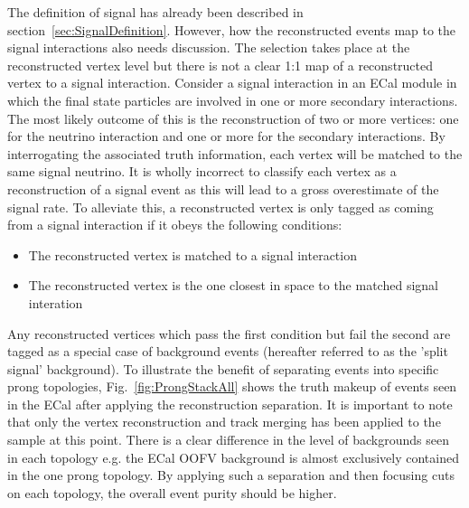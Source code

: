 \newline
The definition of signal has already been described in section~\ref{sec:SignalDefinition}.  However, how the reconstructed events map to the signal interactions also needs discussion.  The selection takes place at the reconstructed vertex level but there is not a clear 1:1 map of a reconstructed vertex to a signal interaction.  Consider a signal interaction in an ECal module in which the final state particles are involved in one or more secondary interactions.  The most likely outcome of this is the reconstruction of two or more vertices: one for the neutrino interaction and one or more for the secondary interactions.  By interrogating the associated truth information, each vertex will be matched to the same signal neutrino.  It is wholly incorrect to classify each vertex as a reconstruction of a signal event as this will lead to a gross overestimate of the signal rate.  To alleviate this,  a reconstructed vertex is only tagged as coming from a signal interaction if it obeys the following conditions:
\begin{itemize}
  \item The reconstructed vertex is matched to a signal interaction
  \item The reconstructed vertex is the one closest in space to the matched signal interation
\end{itemize}
Any reconstructed vertices which pass the first condition but fail the second are tagged as a special case of background events (hereafter referred to as the 'split signal' background).
\newline
\newline
To illustrate the benefit of separating events into specific prong topologies, Fig.~\ref{fig:ProngStackAll} shows the truth makeup of events seen in the ECal after applying the reconstruction separation.  It is important to note that only the vertex reconstruction and track merging has been applied to the sample at this point.  There is a clear difference in the level of backgrounds seen in each topology e.g. the ECal OOFV background is almost exclusively contained in the one prong topology.  By applying such a separation and then focusing cuts on each topology, the overall event purity should be higher. 
